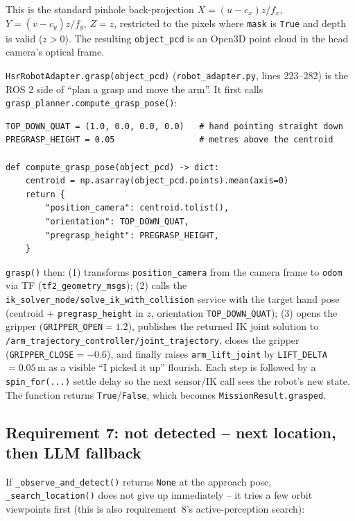 \documentclass[11pt]{article}
\begin{document}
This is the standard pinhole back-projection $X = (u-c_x)z/f_x$,
$Y=(v-c_y)z/f_y$, $Z=z$, restricted to the pixels where \texttt{mask} is
\texttt{True} and depth is valid ($z>0$). The resulting \texttt{object\_pcd}
is an Open3D point cloud in the head camera's optical frame.

\texttt{HsrRobotAdapter.grasp(object\_pcd)} (\texttt{robot\_adapter.py}, lines
223--282) is the ROS 2 side of ``plan a grasp and move the arm''. It first
calls \texttt{grasp\_planner.compute\_grasp\_pose()}:

\begin{lstlisting}[caption={\texttt{grasp\_planner.py}: top-down grasp from the object point cloud's centroid (lines 12--29)}]
TOP_DOWN_QUAT = (1.0, 0.0, 0.0, 0.0)   # hand pointing straight down
PREGRASP_HEIGHT = 0.05                 # metres above the centroid

def compute_grasp_pose(object_pcd) -> dict:
    centroid = np.asarray(object_pcd.points).mean(axis=0)
    return {
        "position_camera": centroid.tolist(),
        "orientation": TOP_DOWN_QUAT,
        "pregrasp_height": PREGRASP_HEIGHT,
    }
\end{lstlisting}

\texttt{grasp()} then: (1) transforms \texttt{position\_camera} from the
camera frame to \texttt{odom} via TF (\texttt{tf2\_geometry\_msgs}); (2) calls
the \texttt{ik\_solver\_node/solve\_ik\_with\_collision} service with the
target hand pose (centroid $+$ \texttt{pregrasp\_height} in $z$, orientation
\texttt{TOP\_DOWN\_QUAT}); (3) opens the gripper
(\texttt{GRIPPER\_OPEN}$=1.2$), publishes the returned IK joint solution to
\texttt{/arm\_trajectory\_controller/joint\_trajectory}, closes the gripper
(\texttt{GRIPPER\_CLOSE}$=-0.6$), and finally raises
\texttt{arm\_lift\_joint} by \texttt{LIFT\_DELTA}$=0.05\,$m as a visible
``I picked it up'' flourish. Each step is followed by a
\texttt{spin\_for(...)} settle delay so the next sensor/IK call sees the
robot's new state. The function returns \texttt{True}/\texttt{False}, which
becomes \texttt{MissionResult.grasped}.

\subsection{Requirement 7: not detected -- next location, then LLM fallback}
\label{sec:fallback}

If \texttt{\_observe\_and\_detect()} returns \texttt{None} at the approach
pose, \texttt{\_search\_location()} does not give up immediately -- it tries
a few orbit viewpoints first (this is also requirement~8's active-perception
search):
\end{document}

